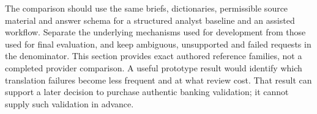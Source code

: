The comparison should use the same briefs, dictionaries, permissible source
material and answer schema for a structured analyst baseline and an assisted
workflow. Separate the underlying mechanisms used for development from those
used for final evaluation, and keep ambiguous, unsupported and failed requests
in the denominator. This section provides exact authored reference families,
not a completed provider comparison. A useful prototype result would identify
which translation failures become less frequent and at what review cost.
That result can support a later decision to purchase authentic banking
validation; it cannot supply such validation in advance.
\label{exec17:l2-monetary-end}
